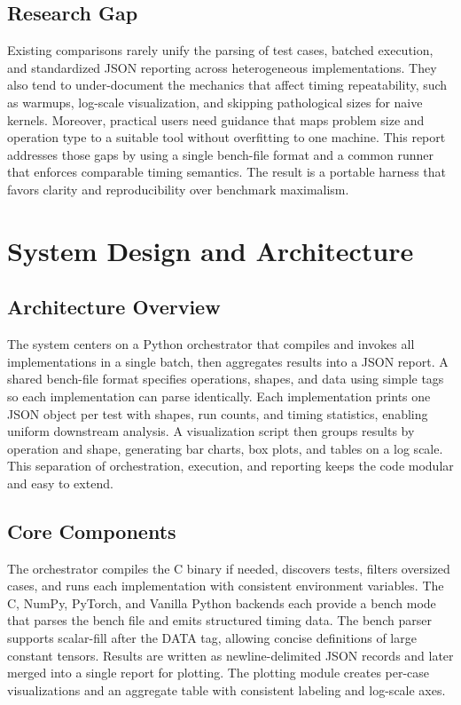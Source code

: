 \documentclass[a4paper,12pt]{article}
\begin{document}
\subsection{Research Gap}
Existing comparisons rarely unify the parsing of test cases, batched execution, and standardized JSON reporting across heterogeneous implementations. They also tend to under-document the mechanics that affect timing repeatability, such as warmups, log-scale visualization, and skipping pathological sizes for naive kernels. Moreover, practical users need guidance that maps problem size and operation type to a suitable tool without overfitting to one machine. This report addresses those gaps by using a single bench-file format and a common runner that enforces comparable timing semantics. The result is a portable harness that favors clarity and reproducibility over benchmark maximalism.

\section{System Design and Architecture}
\subsection{Architecture Overview}
The system centers on a Python orchestrator that compiles and invokes all implementations in a single batch, then aggregates results into a JSON report. A shared bench-file format specifies operations, shapes, and data using simple tags so each implementation can parse identically. Each implementation prints one JSON object per test with shapes, run counts, and timing statistics, enabling uniform downstream analysis. A visualization script then groups results by operation and shape, generating bar charts, box plots, and tables on a log scale. This separation of orchestration, execution, and reporting keeps the code modular and easy to extend.

\subsection{Core Components}
The orchestrator compiles the C binary if needed, discovers tests, filters oversized cases, and runs each implementation with consistent environment variables. The C, NumPy, PyTorch, and Vanilla Python backends each provide a bench mode that parses the bench file and emits structured timing data. The bench parser supports scalar-fill after the DATA tag, allowing concise definitions of large constant tensors. Results are written as newline-delimited JSON records and later merged into a single report for plotting. The plotting module creates per-case visualizations and an aggregate table with consistent labeling and log-scale axes.
\end{document}
